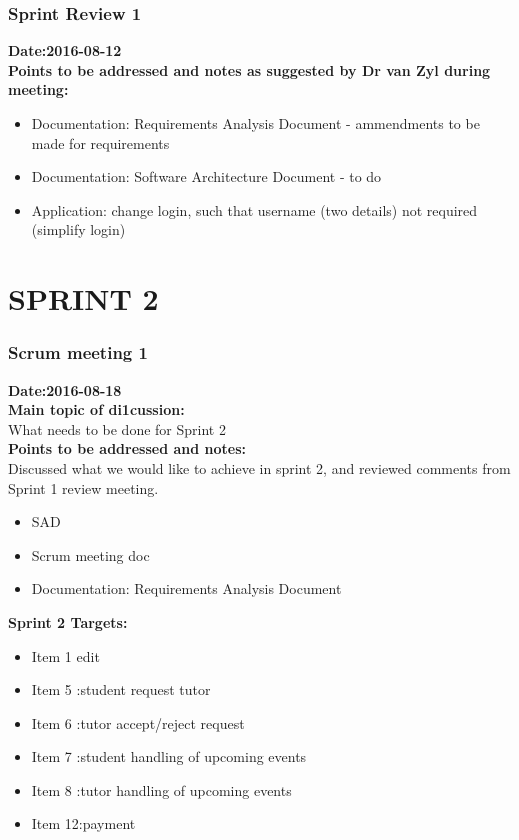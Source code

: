 \documentclass[12pt]{article}
\begin{document}
{%
\subsubsection{Sprint Review 1}
\textbf{Date:2016-08-12}\\
\textbf{Points to be addressed and notes as suggested by Dr van Zyl during meeting:}\\
\begin{itemize}
\item Documentation: Requirements Analysis Document - ammendments to be made for requirements
\item Documentation: Software Architecture Document - to do
\item Application: change login, such that username (two details) not required (simplify login)
\end{itemize} 


\section{SPRINT 2}
\subsubsection{Scrum meeting 1}
\textbf{Date:2016-08-18}\\
\textbf{Main topic of di1cussion:}\\
What needs to be done for Sprint 2\\
\textbf{Points to be addressed and notes:}\\
Discussed what we would like to achieve in sprint 2, and reviewed comments from Sprint 1 review meeting. 
\begin{itemize}
\item SAD 
\item Scrum meeting doc
\item Documentation: Requirements Analysis Document
\end{itemize}
\textbf{Sprint 2 Targets:}\\
\begin{itemize}
\item Item 1 edit 
\item Item 5 :student request tutor
\item Item 6 :tutor accept/reject request
\item Item 7 :student handling of upcoming events
\item Item 8 :tutor handling of upcoming events
\item Item 12:payment 
\end{itemize}
}
\end{document}
